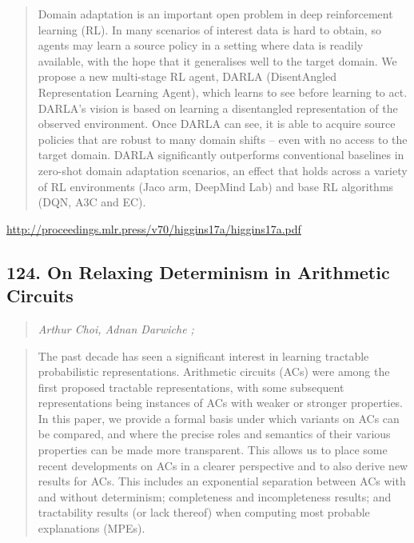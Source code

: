 \documentclass{article}
\begin{document}
\begin{quote}
    Domain adaptation is an important open problem in deep reinforcement learning (RL). In many scenarios of interest data is hard to obtain, so agents may learn a source policy in a setting where data is readily available, with the hope that it generalises well to the target domain. We propose a new multi-stage RL agent, DARLA (DisentAngled Representation Learning Agent), which learns to see before learning to act. DARLA’s vision is based on learning a disentangled representation of the observed environment. Once DARLA can see, it is able to acquire source policies that are robust to many domain shifts – even with no access to the target domain. DARLA significantly outperforms conventional baselines in zero-shot domain adaptation scenarios, an effect that holds across a variety of RL environments (Jaco arm, DeepMind Lab) and base RL algorithms (DQN, A3C and EC).  
\end{quote}

\href{http://proceedings.mlr.press/v70/higgins17a/higgins17a.pdf}{http://proceedings.mlr.press/v70/higgins17a/higgins17a.pdf}

\subsection{124. On Relaxing Determinism in Arithmetic Circuits}

\begin{quote}
\footnotesize{\textit{Arthur Choi, Adnan Darwiche ;}}

\end{quote}

\begin{quote}
    The past decade has seen a significant interest in learning tractable probabilistic representations. Arithmetic circuits (ACs) were among the first proposed tractable representations, with some subsequent representations being instances of ACs with weaker or stronger properties. In this paper, we provide a formal basis under which variants on ACs can be compared, and where the precise roles and semantics of their various properties can be made more transparent. This allows us to place some recent developments on ACs in a clearer perspective and to also derive new results for ACs. This includes an exponential separation between ACs with and without determinism; completeness and incompleteness results; and tractability results (or lack thereof) when computing most probable explanations (MPEs).  
\end{quote}
\end{document}
